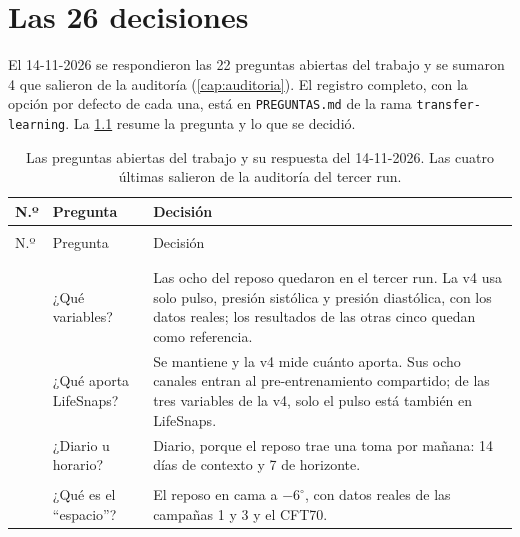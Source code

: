 \chapter{Las 26 decisiones}\label{ap:decisiones}

El 14-11-2026 se respondieron las 22 preguntas abiertas del trabajo y se sumaron 4 que salieron de la auditoría
(\cref{cap:auditoria}). El registro completo, con la opción por defecto de cada una, está en \texttt{PREGUNTAS.md} de la
rama \texttt{transfer-learning}. La \cref{tab:decisiones} resume la pregunta y lo que se decidió.

\newcommand{\grupo}[1]{\multicolumn{3}{@{}l}{\rule{0pt}{3.2ex}\sffamily\bfseries\small\color{azulnoche}#1}\\[0.4ex]}

{\small
\begin{longtable}{@{}>{\raggedleft\arraybackslash}p{0.55cm} >{\raggedright\arraybackslash}p{4.3cm}
  >{\raggedright\arraybackslash}p{9.3cm}@{}}
\caption[Las 26 decisiones del 14-11-2026]{Las preguntas abiertas del trabajo y su respuesta del 14-11-2026. Las cuatro
últimas salieron de la auditoría del tercer run.}\label{tab:decisiones}\\
\toprule
N.º & Pregunta & Decisión \\
\midrule
\endfirsthead
\multicolumn{3}{@{}l}{\footnotesize\sffamily\color{tinta3} Viene de la página anterior}\\
\toprule
N.º & Pregunta & Decisión \\
\midrule
\endhead
\midrule
\multicolumn{3}{@{}r}{\footnotesize\sffamily\color{tinta3} Sigue en la página siguiente}\\
\endfoot
\bottomrule
\endlastfoot
\grupo{A. Las variables y los datos de Tierra}
1 & ¿Qué variables? & Las ocho del reposo quedaron en el tercer run. La v4 usa solo pulso, presión sistólica y
  presión diastólica, con los datos reales; los resultados de las otras cinco quedan como referencia. \\
2 & ¿Qué aporta LifeSnaps? & Se mantiene y la v4 mide cuánto aporta. Sus ocho canales entran al pre-entrenamiento
  compartido; de las tres variables de la v4, solo el pulso está también en LifeSnaps. \\
3 & ¿Diario u horario? & Diario, porque el reposo trae una toma por mañana: 14 días de contexto y 7 de horizonte. \\
\grupo{B. Los datos del espacio}
4 & ¿Qué es el \enquote{espacio}? & El reposo en cama a $-6^\circ$, con datos reales de las campañas 1 y 3 y el CFT70.

\end{longtable}}
